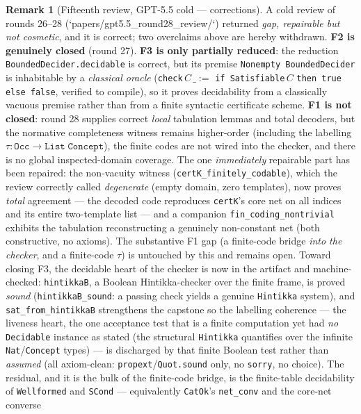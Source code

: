\documentclass[11pt]{article}
\newcommand{\code}[1]{\texttt{#1}}
\theoremstyle{plain}
\theoremstyle{definition}
\newtheorem{remark}[theorem]{Remark}
\begin{document}
\begin{remark}[Fifteenth review, GPT-5.5 cold --- corrections]
A cold review of rounds 26--28 (`papers/gpt5.5\_round28\_review/`)
returned \emph{gap, repairable but not cosmetic}, and it is correct; two
overclaims above are hereby withdrawn. \textbf{F2 is genuinely closed}
(round 27). \textbf{F3 is only partially reduced}: the reduction
\code{BoundedDecider.decidable} is correct, but its premise
\code{Nonempty BoundedDecider} is inhabitable by a \emph{classical
oracle} (\code{check}\,$C$\,$\_ :=$ \code{if Satisfiable}\,$C$
\code{then true else false}, verified to compile), so it proves
decidability from a classically vacuous premise rather than from a
finite syntactic certificate scheme. \textbf{F1 is not closed}: round 28
supplies correct \emph{local} tabulation lemmas and total decoders, but
the normative completeness witness remains higher-order (including the
labelling $\tau : \mathtt{Occ} \to \mathtt{List\;Concept}$), the
finite codes are not wired into the checker, and there is no global
inspected-domain coverage. The one \emph{immediately} repairable part
has been repaired: the non-vacuity witness
(\code{certK\_finitely\_codable}), which the review correctly called
\emph{degenerate} (empty domain, zero templates), now proves
\emph{total} agreement --- the decoded code reproduces \code{certK}'s
core net on all indices and its entire two-template list --- and a
companion \code{fin\_coding\_nontrivial} exhibits the tabulation
reconstructing a genuinely non-constant net (both constructive, no
axioms). The substantive F1 gap (a finite-code bridge \emph{into the
checker}, and a finite-code $\tau$) is untouched by this and remains
open. Toward closing F3, the decidable heart of the checker is now in the
artifact and machine-checked: \code{hintikkaB}, a Boolean
Hintikka-checker over the finite frame, is proved \emph{sound}
(\code{hintikkaB\_sound}: a passing check yields a genuine
\code{Hintikka} system), and \code{sat\_from\_hintikkaB} strengthens the
capstone so the labelling coherence --- the liveness heart, the one
acceptance test that is a finite computation yet had \emph{no}
\code{Decidable} instance as stated (the structural \code{Hintikka}
quantifies over the infinite \code{Nat}/\code{Concept} types) --- is
discharged by that finite Boolean test rather than \emph{assumed} (all
axiom-clean: \code{propext}/\code{Quot.sound} only, no \code{sorry}, no
choice). The residual, and it is the bulk of the finite-code bridge, is
the finite-table decidability of \code{Wellformed} and \code{SCond} ---
equivalently \code{CatOk}'s \code{net\_conv} and the core-net converse

\end{remark}
\end{document}
